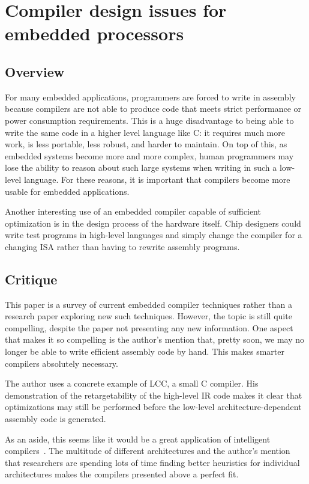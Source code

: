 \documentclass[12pt,letterpaper]{article}
\begin{document}
\section{Compiler design issues for embedded processors}

\subsection{Overview}
For many embedded applications, programmers are forced to write in assembly
because compilers are not able to produce code that meets strict performance or
power consumption requirements. This is a huge disadvantage to being able to
write the same code in a higher level language like C: it requires much more
work, is less portable, less robust, and harder to maintain. On top of this, as
embedded systems become more and more complex, human programmers may lose the
ability to reason about such large systems when writing in such a low-level
language. For these reasons, it is important that compilers become more usable
for embedded applications.

Another interesting use of an embedded compiler capable of sufficient
optimization is in the design process of the hardware itself. Chip designers
could write test programs in high-level languages and simply change the compiler
for a changing ISA rather than having to rewrite assembly programs.

\subsection{Critique}
This paper is a survey of current embedded compiler techniques rather than a
research paper exploring new such techniques. However, the topic is still quite
compelling, despite the paper not presenting any new information. One aspect
that makes it so compelling is the author's mention that, pretty soon, we may no
longer be able to write efficient assembly code by hand. This makes smarter
compilers absolutely necessary.

The author uses a concrete example of LCC, a small C compiler. His demonstration
of the retargetability of the high-level IR code makes it clear that
optimizations may still be performed before the low-level architecture-dependent
assembly code is generated.

As an aside, this seems like it would be a great application of intelligent
compilers~\cite{4663796}. The multitude of different architectures and the
author's mention that researchers are spending lots of time finding better
heuristics for individual architectures makes the compilers presented above a
perfect fit.
\end{document}
